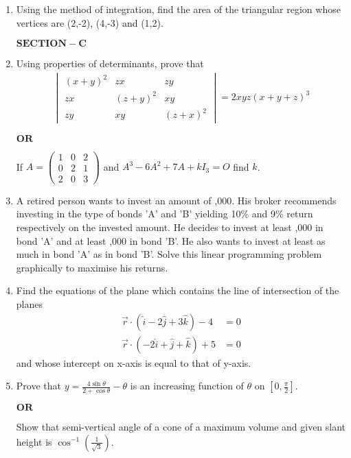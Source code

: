 \documentclass[12pt,-letter paper]{article}
\providecommand{\brak}[1]{\ensuremath{\left(#1\right)}}
\theoremstyle{remark}
\newcommand{\myvec}[1]{\ensuremath{\begin{pmatrix}#1\end{pmatrix}}}
\newcommand{\mydet}[1]{\ensuremath{\begin{vmatrix}#1\end{vmatrix}}}
\let\vec\mathbf
\begin{document}
\begin{enumerate}
\item Using the method of integration, find the area of the triangular region whose vertices are (2,-2), (4,-3) and (1,2).\\

\begin{center} $\vec{SECTION-C}$ \\ \end{center}

\item Using properties of determinants, prove that
\begin{align*}\mydet{\brak{x+y}^2 & zx & zy \\ zx & \brak{z+y}^2 & xy \\ zy & xy & \brak{z+x}^2} = 2xyz\brak{x+y+z}^3
\end{align*}
\begin{center} $\vec{OR}$ \\ \end{center}
If $A = \myvec{1 & 0 & 2 \\ 0 & 2 & 1 \\ 2 & 0 & 3}$ and $A^3 - 6A^2 + 7A + kI_3 = O$ find $k$.

\item A retired person wants to invest an amount of ,000. His broker recommends investing in the type of bonds 'A' and 'B' yielding 10\% and 9\% return respectively on the invested amount. He decides to invest at least ,000 in bond 'A' and at least ,000 in bond 'B'. He also wants to invest at least as much in bond 'A' as in bond 'B'. Solve this linear programming problem graphically to maximise his returns.\\

\item Find the equations of the plane which contains the line of intersection of the planes
\begin{align*}\overrightarrow{r}\cdot\brak{\hat{i} -2\hat{j} + 3\hat{k}}-4&=0 \\ 
\overrightarrow{r}\cdot\brak{-2\hat{i} + \hat{j} + \hat{k}}+5&=0 
\end{align*}
and whose intercept on x-axis is equal to that of y-axis.\\

\item Prove that $y = \frac{4\sin\theta}{2+\cos\theta} - \theta$ is an increasing function of $\theta$ on $\left [0, \frac{\pi}{2}\right ]$.
\begin{center} $\vec{OR}$ \\ \end{center}
Show that semi-vertical angle of a cone of a maximum volume and given slant height is $\cos^{-1}\brak{\frac{1}{\sqrt{3}}}$.


\end{enumerate}
\end{document}
